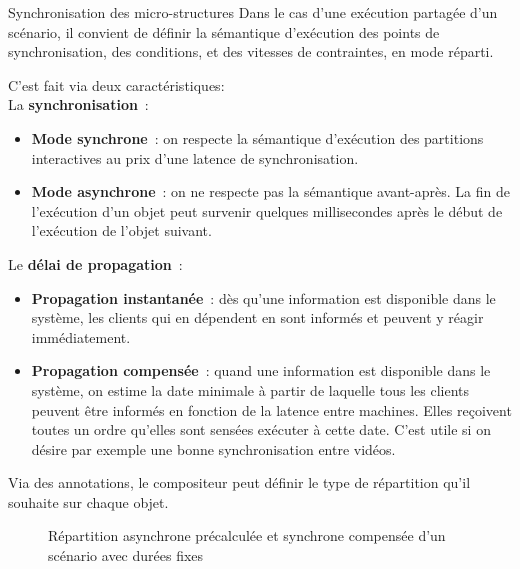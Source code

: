 \begin{block}{Synchronisation des micro-structures}
    Dans le cas d'une exécution partagée d'un scénario, il convient de définir la sémantique d'exécution des points de synchronisation, des conditions, et des vitesses de contraintes, en mode réparti. 
   
    C'est fait via deux caractéristiques:~\\
    La \textbf{synchronisation}~:
	\begin{itemize}
		\item \textbf{Mode synchrone}~: on respecte la sémantique d'exécution des partitions interactives au prix d'une latence de synchronisation.
		\item \textbf{Mode asynchrone}~: on ne respecte pas la sémantique avant-après. La fin de l'exécution d'un objet peut survenir quelques millisecondes après le début de l'exécution de l'objet suivant.
	\end{itemize}

Le \textbf{délai de propagation}~:
\begin{itemize}
    \item \textbf{Propagation instantanée}~: dès qu'une information est disponible dans le système, les clients qui en dépendent en sont informés et peuvent y réagir immédiatement. 
    \item \textbf{Propagation compensée}~: quand une information est disponible dans le système, on estime la date minimale à partir de laquelle tous les clients peuvent être informés en fonction de la latence entre machines. Elles reçoivent toutes un ordre qu'elles sont sensées exécuter à cette date. C'est utile si on désire par exemple une bonne synchronisation entre vidéos.
\end{itemize}

Via des annotations, le compositeur peut définir le type de répartition qu'il souhaite sur chaque objet.

\begin{figure}
	\begin{tikzpicture}[scale=4]
	
	\end{tikzpicture}
	\begin{tikzpicture}[scale=4]
	
	\end{tikzpicture}
	\begin{tikzpicture}[scale=4]
	
	\end{tikzpicture}
	\caption{Répartition asynchrone précalculée et synchrone compensée d'un scénario avec durées fixes}
\end{figure}
\end{block}